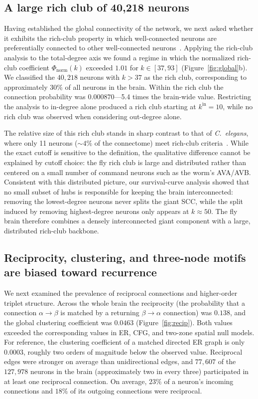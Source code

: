 \documentclass[11pt]{article}
\begin{document}
\subsection{A large rich club of 40{,}218 neurons}

Having established the global connectivity of the network, we next asked
whether it exhibits the rich-club property in which well-connected neurons
are preferentially connected to other well-connected
neurons~\cite{colizza2006detecting,vandenheuvel2011rich}. Applying the
rich-club analysis to the total-degree axis we found a regime in which the
normalized rich-club coefficient $\Phi_{\mathrm{norm}}(k)$ exceeded
$1.01$ for $k \in [37, 93]$ (Figure~\ref{fig:global}b). We classified the
$40{,}218$ neurons with $k > 37$ as the rich club, corresponding to
approximately 30\% of all neurons in the brain. Within the rich club the
connection probability was $0.000870$---5.4 times the brain-wide value.
Restricting the analysis to in-degree alone produced a rich club starting
at $k^{\text{in}} = 10$, while no rich club was observed when considering
out-degree alone.

The relative size of this rich club stands in sharp contrast to that of
\textit{C.\ elegans}, where only 11 neurons ($\sim 4\%$ of the
connectome) meet rich-club criteria~\cite{towlson2013rich}. While the
exact cutoff is sensitive to the definition, the qualitative difference
cannot be explained by cutoff choice: the fly rich club is large and
distributed rather than centered on a small number of command neurons such
as the worm's AVA/AVB. Consistent with this distributed picture, our
survival-curve analysis showed that no small subset of hubs is
responsible for keeping the brain interconnected: removing the lowest-degree
neurons never splits the giant SCC, while the split induced by removing
highest-degree neurons only appears at $k \approx 50$. The fly brain
therefore combines a densely interconnected giant component with a large,
distributed rich-club backbone.

\subsection{Reciprocity, clustering, and three-node motifs are biased toward recurrence}

We next examined the prevalence of reciprocal connections and higher-order
triplet structure. Across the whole brain the reciprocity (the probability
that a connection $\alpha \to \beta$ is matched by a returning
$\beta \to \alpha$ connection) was $0.138$, and the global clustering
coefficient was $0.0463$ (Figure~\ref{fig:recip}). Both values exceeded
the corresponding values in ER, CFG, and two-zone spatial null models. For
reference, the clustering coefficient of a matched directed ER graph is
only $0.0003$, roughly two orders of magnitude below the observed value.
Reciprocal edges were stronger on average than unidirectional edges, and
$77{,}607$ of the $127{,}978$ neurons in the brain (approximately two in
every three) participated in at least one reciprocal connection. On
average, $23\%$ of a neuron's incoming connections and $18\%$ of its
outgoing connections were reciprocal.
\end{document}
